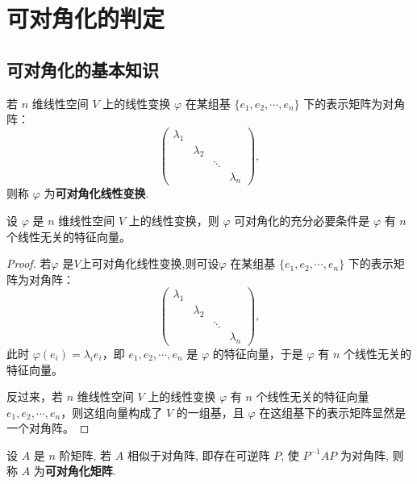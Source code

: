 \documentclass[../../main.tex]{subfiles}%
\begin{document}
\section{可对角化的判定}

\subsection{可对角化的基本知识}

\begin{definition}[可对角化线性变换]
若 $n$ 维线性空间 $V$ 上的线性变换 $\varphi$ 在某组基 $\{e_1, e_2, \cdots, e_n\}$ 下的表示矩阵为对角阵：
\[
\begin{pmatrix}
\lambda_1 & & & \\
& \lambda_2 & & \\
& & \ddots & \\
& & & \lambda_n
\end{pmatrix},
\]
则称 $\varphi$ 为\textbf{可对角化线性变换}.
\end{definition}

\begin{theorem}[线性变换可对角化的充要条件]\label{theorem:线性变换可对角化的充要条件}
设 $\varphi$ 是 $n$ 维线性空间 $V$ 上的线性变换，则 $\varphi$ 可对角化的充分必要条件是 $\varphi$ 有 $n$ 个线性无关的特征向量。
\end{theorem}
\begin{proof}
若$\varphi$ 是$V$上可对角化线性变换,则可设$\varphi$ 在某组基 $\{e_1, e_2, \cdots, e_n\}$ 下的表示矩阵为对角阵：
\[
\begin{pmatrix}
\lambda_1 & & & \\
& \lambda_2 & & \\
& & \ddots & \\
& & & \lambda_n
\end{pmatrix},
\]
此时 $\varphi(e_i) = \lambda_i e_i$，即 $e_1, e_2, \cdots, e_n$ 是 $\varphi$ 的特征向量，于是 $\varphi$ 有 $n$ 个线性无关的特征向量。

反过来，若 $n$ 维线性空间 $V$ 上的线性变换 $\varphi$ 有 $n$ 个线性无关的特征向量 $e_1, e_2, \cdots, e_n$，则这组向量构成了 $V$ 的一组基，且 $\varphi$ 在这组基下的表示矩阵显然是一个对角阵。
\end{proof}

\begin{definition}[可对角化矩阵]
设 $A$ 是 $n$ 阶矩阵, 若 $A$ 相似于对角阵, 即存在可逆阵 $P$, 使 $P^{-1}AP$ 为对角阵, 则称 $A$ 为\textbf{可对角化矩阵}.
\end{definition}
\end{document}
